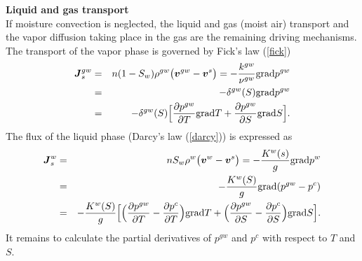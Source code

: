 
{\bf Liquid and gas transport}\\

If moisture convection is neglected, the liquid and gas (moist air) transport and 
the vapor diffusion taking place in the gas are the remaining driving mechanisms.
The transport of the vapor phase is governed by Fick's law (\ref{fick})
\begin{eqnarray}\label{fick_2}
\mbox{\boldmath$J$}^{gw}_s &=& n(1-S_w) \rho^{gw} \big( \mbox{\boldmath$v$} ^{gw} - \mbox{\boldmath$v$}^s \big) = 
- \frac{k^{gw}}{\nu^{gw}} {\rm grad} p^{gw}\nonumber\\
&=&-\delta^{gw}(S) {\rm grad} p^{gw}\nonumber\\
&=&-\delta^{gw}(S)\Big[\frac{\partial p^{gw}}{\partial T} {\rm grad} T + \frac{\partial p^{gw}}{\partial S} {\rm grad} 
S \Big].
\end{eqnarray}
The flux of the liquid phase (Darcy's law (\ref{darcy})) is expressed as
\begin{eqnarray}\label{darcy_2}
\mbox{\boldmath$J$}_s^{w} &=& n S_w \rho^w \big( \mbox{\boldmath$v$} ^{w} - \mbox{\boldmath$v$}^s \big) = - \frac{K^w(s)}{g} {\rm grad} p^w\nonumber\\
&=& - \frac{K^w(S)}{g} {\rm grad} (p^{gw} - p^c)\nonumber\\
&=& - \frac{K^w(S)}{g}\Big[\Big(
\frac{\partial p^{gw}}{\partial T} - \frac{\partial p^{c}}{\partial T}\Big) {\rm grad} T
+ \Big(\frac{\partial p^{gw}}{\partial S} - \frac{\partial p^{c}}{\partial S}\Big) {\rm grad} S \Big].
\end{eqnarray}
It remains to calculate the partial derivatives of $p^{gw}$ and $p^c$ with respect to $T$ and $S$.

